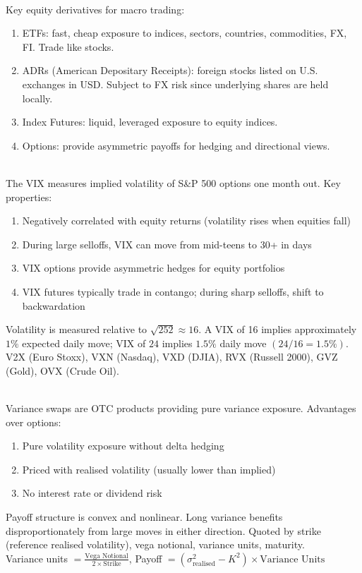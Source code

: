 \documentclass[a4paper,oneside,openany]{book}
\begin{document}
\begin{remark} \\
Key equity derivatives for macro trading:
\begin{enumerate}[label=\roman*.]
\setlength{\itemsep}{0pt}
\item ETFs: fast, cheap exposure to indices, sectors, countries, commodities, FX, FI. Trade like stocks.
\item ADRs (American Depositary Receipts): foreign stocks listed on U.S. exchanges in USD. Subject to FX risk since underlying shares are held locally.
\item Index Futures: liquid, leveraged exposure to equity indices.
\item Options: provide asymmetric payoffs for hedging and directional views.
\end{enumerate}
\end{remark}

\begin{remark} \\
The VIX measures implied volatility of S\&P 500 options one month out. Key properties:
\begin{enumerate}[label=\roman*.]
\setlength{\itemsep}{0pt}
\item Negatively correlated with equity returns (volatility rises when equities fall)
\item During large selloffs, VIX can move from mid-teens to 30+ in days
\item VIX options provide asymmetric hedges for equity portfolios
\item VIX futures typically trade in contango; during sharp selloffs, shift to backwardation
\end{enumerate}
Volatility is measured relative to $\sqrt{252} \approx 16$. A VIX of 16 implies approximately $1\%$ expected daily move; VIX of $24$ implies $1.5\%$ daily move $(24/16 = 1.5\%)$.\\
V2X (Euro Stoxx), VXN (Nasdaq), VXD (DJIA), RVX (Russell 2000), GVZ (Gold), OVX (Crude Oil).
\end{remark}

\begin{remark} \\
Variance swaps are OTC products providing pure variance exposure. Advantages over options:
\begin{enumerate}[label=\roman*.]
\setlength{\itemsep}{0pt}
\item Pure volatility exposure without delta hedging
\item Priced with realised volatility (usually lower than implied)
\item No interest rate or dividend risk
\end{enumerate}
Payoff structure is convex and nonlinear. Long variance benefits disproportionately from large moves in either direction. Quoted by strike (reference realised volatility), vega notional, variance units, maturity.\\
Variance units $= \frac{\text{Vega Notional}}{2 \times \text{Strike}}$, Payoff $= (\sigma_{\text{realised}}^2 - K^2) \times \text{Variance Units}$
\end{remark}
\end{document}
